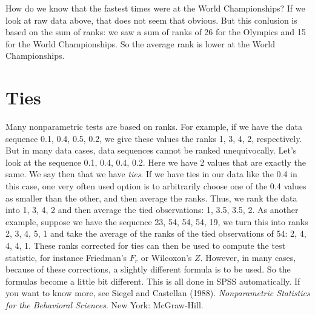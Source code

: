 \documentclass[]{book}\usepackage[]{graphicx}\usepackage[]{color}
\begin{document}
How do we know that the fastest times were at the World Championships? If we look at raw data above, that does not seem that obvious. But this conlusion is based on the sum of ranks: we saw a sum of ranks of 26 for the Olympics and 15 for the World Championships. So the average rank is lower at the World Championships.


\section{Ties}

Many nonparametric tests are based on ranks. For example, if we have the data sequence {0.1, 0.4, 0.5, 0.2}, we give these values the ranks {1, 3, 4, 2}, respectively. But in many data cases, data sequences cannot be ranked unequivocally. Let's look at the sequence {0.1, 0.4, 0.4, 0.2}. Here we have 2 values that are exactly the same. We say then that we have \textit{ties}. If we have ties in our data like the 0.4 in this case, one very often used option is to arbitrarily choose one of the 0.4 values as smaller than the other, and then average the ranks. Thus, we rank the data into {1, 3, 4, 2} and then average the tied observations: {1, 3.5, 3.5, 2}. As another example, suppose we have the sequence {23, 54, 54, 54, 19}, we turn this into ranks {2, 3, 4, 5, 1} and take the average of the ranks of the tied observations of 54: {2, 4, 4, 4, 1}. These ranks corrected for ties can then be used to compute the test statistic, for instance Friedman's $F_r$ or Wilcoxon's $Z$. However, in many cases, because of these corrections, a slightly different formula is to be used. So the formulas become a little bit different. This is all done in SPSS automatically. If you want to know more, see Siegel and Castellan (1988). \textit{Nonparametric Statistics for the Behavioral Sciences}. New York: McGraw-Hill. 
\end{document}
